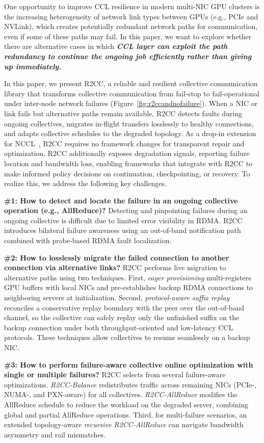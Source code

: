 \documentclass[letterpaper,twocolumn,10pt]{article}
\begin{document}
One opportunity to improve CCL resilience in modern multi-NIC GPU clusters is the increasing heterogeneity of network link types between GPUs (e.g., PCIe and NVLink), which creates potentially redundant network paths for communication, even if some of these paths may fail. In this paper, we want to explore whether there are alternative cases in which
\textbf{\textit{CCL layer can exploit the path redundancy to continue the ongoing job efficiently rather than giving up immediately.}}

In this paper, we present R2CC, a reliable and resilient collective communication library that transforms collective communication from fail-stop to fail-operational under inter-node network failures (Figure~\ref{fig:r2ccandnofailure}). When a NIC or link fails but alternative paths remain available, R2CC detects faults during ongoing collectives, migrates in-flight transfers losslessly to healthy connections, and adapts collective schedules to the degraded topology. As a drop-in extension for NCCL~\cite{NCCL}, R2CC requires no framework changes for transparent repair and optimization. R2CC additionally exposes degradation signals, reporting failure location and bandwidth loss, enabling frameworks that integrate with R2CC to make informed policy decisions on continuation, checkpointing, or recovery. To realize this, we address the following key challenges.

{\bf \#1: How to detect and locate the failure in an ongoing collective operation (e.g., AllReduce)?} Detecting and pinpointing failures during an ongoing collective is difficult due to limited error visibility in RDMA. R2CC introduces bilateral failure awareness using an out-of-band notification path combined with probe-based RDMA fault localization.

{\bf \#2: How to losslessly migrate the failed connection to another connection via alternative links?} R2CC performs live migration to alternative paths using two techniques. First, \textit{eager provisioning} multi-registers GPU buffers with local NICs and pre-establishes backup RDMA connections to neighboring servers at initialization. Second, \textit{protocol-aware suffix replay} reconciles a conservative replay boundary with the peer over the out-of-band channel, so the collective can safely replay only the unfinished suffix on the backup connection under both throughput-oriented and low-latency CCL protocols.
These techniques allow collectives to resume seamlessly on a backup NIC.

{\bf \#3: How to perform failure-aware collective online optimization  with single or multiple failures?} R2CC selects from several failure-aware optimizations. \textit{R2CC-Balance} redistributes traffic across remaining NICs (PCIe-, NUMA-, and PXN-aware) for all collectives. \textit{R2CC-AllReduce} modifies the AllReduce schedule to reduce the workload on the degraded server, combining global and partial AllReduce operations. Third, for multi-failure scenarios, an extended topology-aware \textit{recursive R2CC-AllReduce} can navigate bandwidth asymmetry and rail mismatches.
\end{document}
